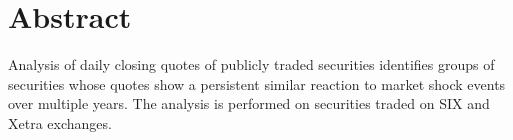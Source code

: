 \documentclass[
10pt, %
a4paper, %
oneside, %
headinclude,footinclude, %
BCOR5mm, %
]{scrartcl}
\title{\normalfont\spacedallcaps{Stock Quote Correlations}} %
\author{\spacedlowsmallcaps{Thomas Bütikofer}} %
\date{} %
\numberwithin{equation}{subsection}
\begin{document}

\renewcommand{\sectionmark}[1]{\markright{\spacedlowsmallcaps{#1}}} %
\lehead{\mbox{\llap{\small\thepage\kern1em\color{halfgray} \vline}\color{halfgray}\hspace{0.5em}\rightmark\hfil}} %

\pagestyle{scrheadings} %


\maketitle %

\setcounter{tocdepth}{2} %





\section*{Abstract} %
Analysis of daily closing quotes of publicly traded securities identifies groups of securities whose quotes show a persistent similar reaction to market shock events over multiple years. The analysis is performed on securities traded on SIX and Xetra exchanges.
\end{document}
